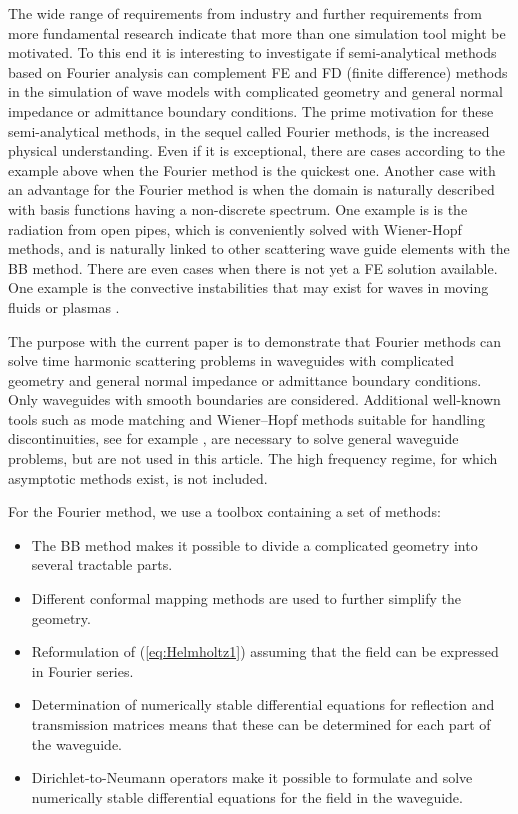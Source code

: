 \documentclass[numreferences]{kluwer}
\begin{document}
The wide range of requirements from industry and further requirements
from more fundamental research indicate that more than one simulation
tool might be motivated. To this end it is interesting to investigate
if semi-analytical methods based on Fourier analysis can complement FE
and FD (finite difference) methods in the simulation of wave models
with complicated geometry and general normal impedance or admittance
boundary conditions. The prime motivation for these semi-analytical
methods, in the sequel called Fourier methods, is the increased
physical understanding. Even if it is exceptional, there are cases
according to the example above when the Fourier method is the
quickest one. Another case with an advantage for the Fourier
method is when the domain is naturally described with basis functions
having a non-discrete spectrum. One example is is the radiation from
open pipes, which is conveniently solved with Wiener-Hopf methods, and
is naturally linked to other scattering wave guide elements with the
BB method. There are even cases when there is not yet a FE solution
available. One example is the convective instabilities that may exist
for waves in moving fluids \cite{nilssonbrander1980a} or plasmas
\cite{briggs1964}.

The purpose with the current paper is to demonstrate that Fourier
methods can solve time harmonic scattering problems in waveguides with
complicated geometry and general normal impedance or admittance
boundary conditions. Only waveguides with smooth boundaries are
considered. Additional well-known tools such as mode matching and
Wiener--Hopf methods suitable for handling discontinuities, see for
example \cite{jones1986}, are necessary to solve general waveguide
problems, but are not used in this article. The high frequency regime,
for which asymptotic methods exist, is not included.

For the Fourier method, we use a toolbox containing a set of
methods:
\begin{itemize}
\item The BB method makes it possible to divide a complicated geometry
  into several tractable parts.
\item Different conformal mapping methods are used to further simplify
  the geometry.
\item Reformulation of (\ref{eq:Helmholtz1}) assuming that the field
  can be expressed in Fourier series.
\item Determination of numerically stable differential equations for
  reflection and transmission matrices means that these can be
  determined for each part of the waveguide.
\item Dirichlet-to-Neumann operators make it possible to formulate and
  solve numerically stable differential equations for the field in the
  waveguide.
\end{itemize}
\end{document}
